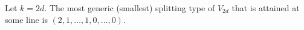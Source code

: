 \begin{proposition} \label{generic-splitting-type-2d}
	Let $k=2d.$ The most generic (\ie smallest) splitting type of $V_{2d}$ that is attained at some line is $(2,1,\dotsc,1,0,\dotsc,0)$.
\end{proposition}
